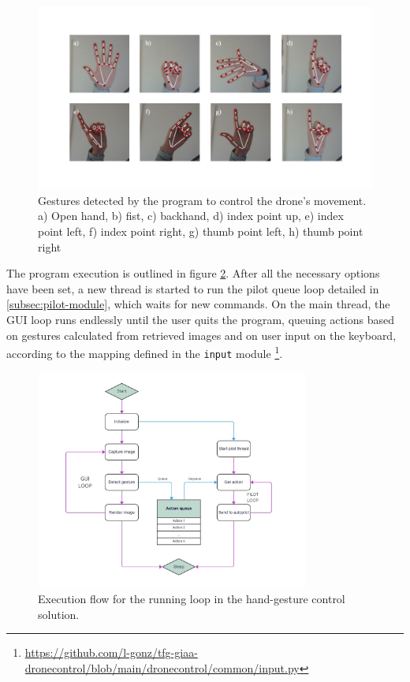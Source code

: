 \begin{figure}
  \centering
  \includegraphics[width=\textwidth, keepaspectratio]{img/hand-gestures.jpg}
  \caption{Gestures detected by the program to control the drone's movement. a) Open hand, b) fist, c) backhand, d) index point up, e) index point left, f) index point right, g) thumb point left, h) thumb point right}
  \label{fig:hand-gestures}
\end{figure}


The program execution is outlined in figure \ref{fig:hands-loop}.
After all the necessary options have been set, a new thread is started to run the pilot queue loop detailed in \ref{subsec:pilot-module}, which waits for new commands.
On the main thread, the GUI loop runs endlessly until the user quits the program, queuing actions based on gestures calculated from retrieved images and on user input on the keyboard, according to the mapping defined in the \texttt{input} module \footnote{\url{https://github.com/l-gonz/tfg-giaa-dronecontrol/blob/main/dronecontrol/common/input.py}}.

\begin{figure}
  \centering
  \includegraphics[width=0.8\textwidth, keepaspectratio]{img/hand-loop.jpg}
  \caption{Execution flow for the running loop in the hand-gesture control solution.}
  \label{fig:hands-loop}
\end{figure}


